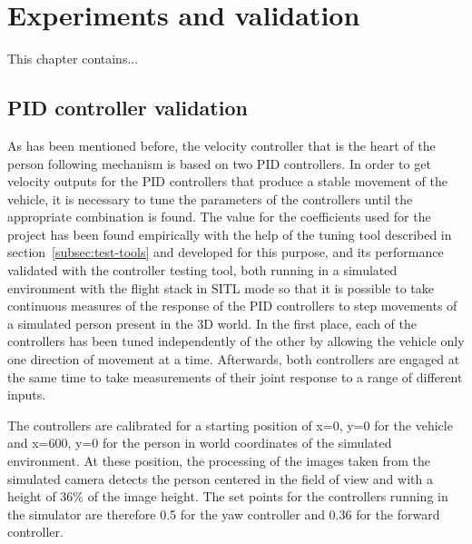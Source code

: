 \chapter{Experiments and validation}
\label{chap:validation}

This chapter contains...


\clearpage

\section{PID controller validation}
\label{sec:test-1-pid}



As has been mentioned before, the velocity controller that is the heart of the person following mechanism is based on two PID controllers.
In order to get velocity outputs for the PID controllers that produce a stable movement of the vehicle, it is necessary to tune the parameters of the controllers until the appropriate combination is found.
The value for the coefficients used for the project has been found empirically with the help of the tuning tool described in section~\ref{subsec:test-tools} and developed for this purpose, and its performance validated with the controller testing tool, both running in a simulated environment with the flight stack in SITL mode so that it is possible to take continuous measures of the response of the PID controllers to step movements of a simulated person present in the 3D world.
In the first place, each of the controllers has been tuned independently of the other by allowing the vehicle only one direction of movement at a time.
Afterwards, both controllers are engaged at the same time to take measurements of their joint response to a range of different inputs.

The controllers are calibrated for a starting position of x=0, y=0 for the vehicle and x=600, y=0 for the person in world coordinates of the simulated environment.
At these position, the processing of the images taken from the simulated camera detects the person centered in the field of view and with a height of 36\% of the image height.
The set points for the controllers running in the simulator are therefore 0.5 for the yaw controller and 0.36 for the forward controller.

